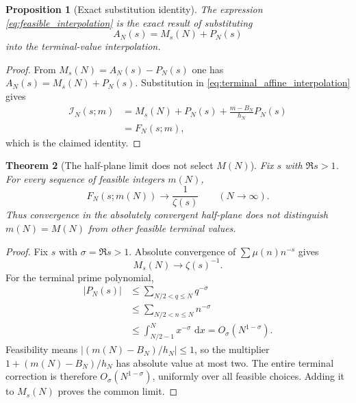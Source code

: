 \documentclass[11pt]{amsart}
\numberwithin{equation}{section}
\theoremstyle{plain}
\newtheorem{theorem}{Theorem}[section]
\newtheorem{proposition}[theorem]{Proposition}
\theoremstyle{definition}
\theoremstyle{remark}
\newcommand{\1}{\mathbf{1}}
\newcommand{\dd}{\,\mathrm{d}}
\begin{document}
\begin{proposition}[Exact substitution identity]
\label{prop:feasible_exact_identity}
The expression \eqref{eq:feasible_interpolation} is the exact result of
substituting
\begin{equation}
A_N(s)=M_s(N)+P_N(s)
\label{eq:A_M_plus_P}
\end{equation}
into the terminal-value interpolation.
\end{proposition}

\begin{proof}
From \(M_s(N)=A_N(s)-P_N(s)\) one has
\(A_N(s)=M_s(N)+P_N(s)\).  Substitution in
\eqref{eq:terminal_affine_interpolation} gives
\begin{align}
\mathcal I_N(s;m)
&=
M_s(N)+P_N(s)
+\frac{m-B_N}{h_N}P_N(s)
\label{eq:feasible_substitution_step}
\\
&=
F_N(s;m),
\label{eq:feasible_substitution_result}
\end{align}
which is the claimed identity.
\end{proof}

\begin{theorem}[The half-plane limit does not select \(M(N)\)]
\label{thm:halfplane_nondistinction}
Fix \(s\) with \(\Re s>1\).  For every sequence of feasible integers
\(m(N)\),
\begin{equation}
\boxed{
F_N(s;m(N))
\longrightarrow
\frac1{\zeta(s)}
\qquad
(N\to\infty).
}
\label{eq:halfplane_nondistinction}
\end{equation}
Thus convergence in the absolutely convergent half-plane does not
distinguish \(m(N)=M(N)\) from other feasible terminal values.
\end{theorem}

\begin{proof}
Fix \(s\) with \(\sigma=\Re s>1\).  Absolute convergence of
\(\sum\mu(n)n^{-s}\) gives
\begin{equation}
M_s(N)\longrightarrow\zeta(s)^{-1}.
\label{eq:halfplane_Ms_limit_detailed}
\end{equation}
For the terminal prime polynomial,
\begin{align}
|P_N(s)|
&\leq
\sum_{N/2<q\leq N}q^{-\sigma}
\label{eq:halfplane_P_bound_one}
\\
&\leq
\sum_{N/2<n\leq N}n^{-\sigma}
\label{eq:halfplane_P_bound_two}
\\
&\leq
\int_{N/2-1}^{N}x^{-\sigma}\,\dd x
=
O_\sigma(N^{1-\sigma}).
\label{eq:halfplane_P_bound_three}
\end{align}
Feasibility means \(|(m(N)-B_N)/h_N|\leq1\), so the multiplier
\(1+(m(N)-B_N)/h_N\) has absolute value at most two.  The entire terminal
correction is therefore \(O_\sigma(N^{1-\sigma})\), uniformly over all
feasible choices.  Adding it to \(M_s(N)\) proves the common limit.
\end{proof}
\end{document}
